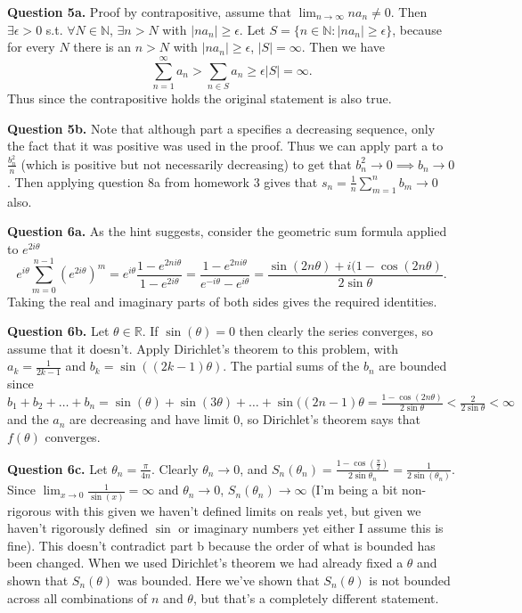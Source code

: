 \documentclass[letterpaper, reqno,11pt]{article}
\begin{document}
\newpage\phantom{blabla}
\newpage

{\medskip\noindent\bf Question 5a.} Proof by contrapositive, assume that $\lim_{n\to\infty}na_n\neq 0$. Then $\exists \epsilon>0$ s.t. $\forall N\in \mathbb{N}$, $\exists n>N$ with $|na_n|\geq\epsilon$. Let $S=\{n\in \mathbb{N}: |na_n|\geq\epsilon\}$, because for every $N$ there is an $n>N$ with $|na_n|\geq\epsilon$, $|S|=\infty$. Then we have
\[
\sum_{n=1}^{\infty}a_n>\sum_{n\in S}a_n\geq \epsilon|S|=\infty
.\]
Thus since the contrapositive holds the original statement is also true.

{\medskip\noindent\bf Question 5b.} Note that although part a specifies a decreasing sequence, only the fact that it was positive was used in the proof. Thus we can apply part a to $\frac{b_n^2}{n}$ (which is positive but not necessarily decreasing) to get that $b_n^2\to 0\implies b_n\to 0$. Then applying question 8a from homework 3 gives that $s_n=\frac{1}{n}\sum_{m=1}^{n}b_m\to 0$ also.

\newpage\phantom{blabla}
\newpage

{\medskip\noindent\bf Question 6a.} As the hint suggests, consider the geometric sum formula applied to $e^{2i\theta}$
\[
e^{i\theta}\sum_{m=0}^{n-1}\left(e^{2i\theta}\right)^{m}=e^{i\theta}\frac{1-e^{2ni\theta}}{1-e^{2i\theta}}=\frac{1-e^{2ni\theta}}{e^{-i\theta}-e^{i\theta}}=\frac{\sin(2n\theta)+i(1-\cos(2n\theta)}{2\sin\theta}
.\]
Taking the real and imaginary parts of both sides gives the required identities.

{\medskip\noindent\bf Question 6b.} Let $\theta\in \mathbb{R}$. If $\sin(\theta)=0$ then clearly the series converges, so assume that it doesn't. Apply Dirichlet's theorem to this problem, with $a_k=\frac{1}{2k-1}$ and $b_k=\sin((2k-1)\theta)$. The partial sums of the $b_n$ are bounded since $b_1+b_2+\ldots+b_n=\sin(\theta)+\sin(3\theta)+\ldots+\sin((2n-1)\theta=\frac{1-\cos(2n\theta)}{2\sin\theta}<\frac{2}{2\sin\theta}<\infty$ and the $a_n$ are decreasing and have limit $0$, so Dirichlet's theorem says that $f(\theta)$ converges.

{\medskip\noindent\bf Question 6c.} Let $\theta_n=\frac{\pi}{4n}$. Clearly $\theta_n\to 0$, and $S_n(\theta_n)=\frac{1-\cos(\frac{\pi}{2})}{2\sin\theta_n}=\frac{1}{2\sin(\theta_n)}$. Since $\lim_{x\to0}\frac{1}{\sin(x)}=\infty$ and $\theta_n\to 0$, $S_n(\theta_n)\to \infty$ (I'm being a bit non-rigorous with this given we haven't defined limits on reals yet, but given we haven't rigorously defined $\sin$ or imaginary numbers yet either I assume this is fine). This doesn't contradict part b because the order of what is bounded has been changed. When we used Dirichlet's theorem we had already fixed a $\theta$ and shown that $S_n(\theta)$ was bounded. Here we've shown that $S_n(\theta)$ is not bounded across all combinations of $n$ and $\theta$, but that's a completely different statement.

\newpage\phantom{blabla}
\newpage
\end{document}
